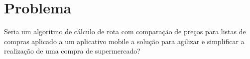 
\section{Problema}
Seria um algoritmo de cálculo de rota com comparação de preços para
listas de compras aplicado a um aplicativo mobile a solução para agilizar 
e simplificar a realização de uma compra de supermercado?